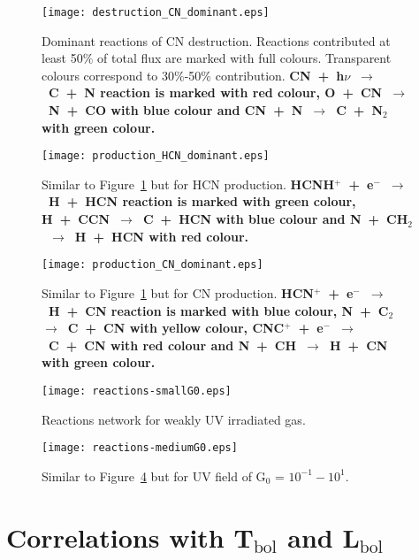 \documentclass{aa}
\begin{document}
\begin{appendix}
\begin{figure} \texttt{[image: destruction\_CN\_dominant.eps]} \caption{Dominant reactions
of CN destruction. Reactions contributed at least 50$\%$ of total flux are marked with full colours.
Transparent colours correspond to 30$\%$-50$\%$ contribution. \textbf{\mbox{CN + h$\nu$ $\rightarrow$ C + N} reaction is marked with red colour, \mbox{O + CN $\rightarrow$ N + CO} with blue colour and \mbox{CN + N $\rightarrow$ C + N$_2$} with green colour.}} \label{CN_dest} \end{figure}

\begin{figure} 
\texttt{[image: production\_HCN\_dominant.eps]} 
\caption{Similar to Figure~\ref{CN_dest} but for HCN production. \textbf{\mbox{HCNH$^+$ + e$^-$ $\rightarrow$ H + HCN} reaction is marked with green colour, \mbox{H + CCN $\rightarrow$ C + HCN} with blue colour and \mbox{N + CH$_2$ $\rightarrow$ H + HCN} with red colour.}} 
\label{HCN_prod} 
\end{figure}

\begin{figure} 
\texttt{[image: production\_CN\_dominant.eps]} 
\caption{Similar to Figure~\ref{CN_dest} but for CN production. \textbf{\mbox{HCN$^+$ + e$^-$ $\rightarrow$ H + CN} reaction is marked with blue colour, \mbox{N + C$_2$ $\rightarrow$ C + CN} with yellow colour, \mbox{CNC$^+$ + e$^-$ $\rightarrow$ C + CN} with red colour and \mbox{N + CH $\rightarrow$ H + CN} with green colour.}} 
\label{CN_prod}
\end{figure}


\begin{figure} 
\texttt{[image: reactions-smallG0.eps]} 
\caption{Reactions network for weakly UV irradiated gas.} 
\label{reactions_smallG0} 
\end{figure}

\begin{figure} 
\texttt{[image: reactions-mediumG0.eps]} 
\caption{Similar to Figure~\ref{reactions_smallG0} but for UV field of G$_0$ = $10^{-1} - 10^{1}$.}
\label{reactions_mediumG0} 
\end{figure}


\section{Correlations with T$_\mathrm{bol}$ and L$_\mathrm{bol}$} 


\end{appendix}
\end{document}
